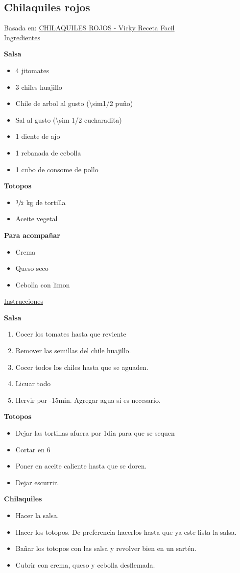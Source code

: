 \subsection{Chilaquiles rojos}\label{chilaquiles-rojos}

Basada en: \href{https://www.youtube.com/watch?v=I8xJOKFjDF4}{CHILAQUILES ROJOS - Vicky Receta Facil} \\

\underline{Ingredientes}

\textbf{Salsa}
\begin{itemize}
\item 4 jitomates
\item 3 chiles huajillo
\item Chile de arbol al gusto (\num{\sim1/2} puño)
\item Sal al gusto (\num{\sim 1/2} cucharadita)
\item 1 diente de ajo
\item 1 rebanada de cebolla
\item 1 cubo de consome de pollo
\end{itemize}

\textbf{Totopos}
\begin{itemize}
\item $\sfrac{1}{2}$ kg de tortilla
\item Aceite vegetal
\end{itemize}

\textbf{Para acompañar}
\begin{itemize}
\item Crema
\item Queso seco
\item Cebolla con limon
\end{itemize}

\underline{Instrucciones}

\textbf{Salsa}
\begin{enumerate}
\item Cocer los tomates hasta que reviente
\item Remover las semillas del chile huajillo. 
\item Cocer todos los chiles hasta que se aguaden.
\item Licuar todo
\item Hervir por -15min. Agregar agua si es necesario.
\end{enumerate}

\textbf{Totopos}
\begin{itemize}
\item Dejar las tortillas afuera por \Sim 1dia para que se sequen
\item Cortar en 6
\item Poner en aceite caliente hasta que se doren.
\item Dejar escurrir.
\end{itemize}

\textbf{Chilaquiles}
\begin{itemize}
\item Hacer la salsa.
\item Hacer los totopos. De preferencia hacerlos hasta que ya este lista la salsa.
\item Bañar los totopos con las salsa y revolver bien en un sartén.
\item Cubrir con crema, queso y cebolla desflemada. 
\end{itemize}

